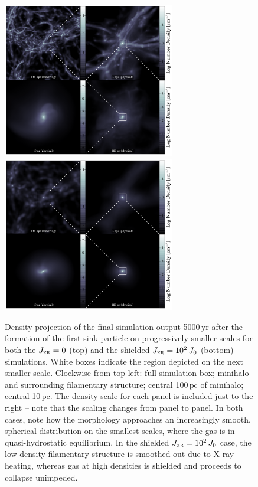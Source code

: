 \documentclass{thesis}
\newcommand{\pc}{\ensuremath{\,\mathrm{pc}}\xspace}
\newcommand{\yr}{\ensuremath{\,\mathrm{yr}}\xspace}
\newcommand{\jxr}{\ensuremath{J_{\textsc{xr}}}\xspace}
\begin{document}
\begin{figure}
  \begin{center}
    \includegraphics[width=0.67\textwidth]{figures/structure/structure-vanilla_t0}
    \includegraphics[width=0.67\textwidth]{figures/structure/structure-xr_tau2_J2_t0}
    \caption{Density projection of the final simulation output 5000\yr after the formation of the first sink particle on progressively smaller scales for both the $\jxr=0$ (top) and the shielded $\jxr=10^2\,J_0$ (bottom) simulations.  White boxes indicate the region depicted on the next smaller scale.  Clockwise from top left: full simulation box; minihalo and surrounding filamentary structure; central 100\pc of minihalo; central 10\pc.  The density scale for each panel is included just to the right -- note that the scaling changes from panel to panel. In both cases, note how the morphology approaches an increasingly smooth, spherical distribution on the smallest scales, where the gas is in quasi-hydrostatic equilibrium.  In the shielded $\jxr=10^2\,J_0$ case, the low-density filamentary structure is smoothed out due to X-ray heating, whereas gas at high densities is shielded and proceeds to collapse unimpeded.}
    \label{zoom-in}
  \end{center}
\end{figure}
\end{document}
